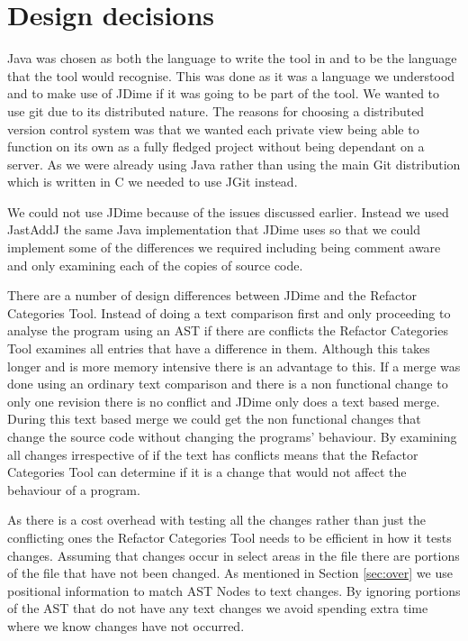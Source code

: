 
\section{Design decisions}
Java was chosen as both the language to write the tool in and to be the language that the tool would recognise.  This was done as it was a language we understood and to make use of JDime if it was going to be part of the tool.  We wanted to use git due to its distributed nature.  The reasons for choosing a distributed version control system was that we wanted each private view being able to function on its own as a fully fledged project without being dependant on a server.  As we were already using Java rather than using the main Git distribution which is written in C we needed to use JGit instead.

We could not use JDime because of the issues discussed earlier. Instead we used JastAddJ the same Java implementation that JDime uses so that we could implement some of the differences we required including being comment aware and only examining each of the copies of source code.

There are a number of design differences between JDime and the Refactor Categories Tool.
 Instead of doing a text comparison first and only proceeding to analyse the program using an AST if there are conflicts the Refactor Categories Tool examines all entries that have a difference in them.
Although this takes longer and is more memory intensive there is an advantage to this.  
If a merge was done using an ordinary text comparison and there is a non functional change to only one revision there is no conflict and JDime only does a text based merge.  
During this text based merge we could get the non functional changes that change the source code without changing the programs' behaviour. By examining all changes irrespective of if the text has conflicts means that the Refactor Categories Tool can determine if it is a change that would not affect the behaviour of a program.

As there is a cost overhead with testing all the changes rather than just the conflicting ones the Refactor Categories Tool needs to be efficient in how it tests changes.  Assuming that changes occur in select areas in the file there are portions of the file that have not been changed.  
As mentioned in Section \ref{sec:over} we use positional information to match AST Nodes to text changes.  By ignoring portions of the AST that do not have any text changes we avoid spending extra time where we know changes have not occurred.

